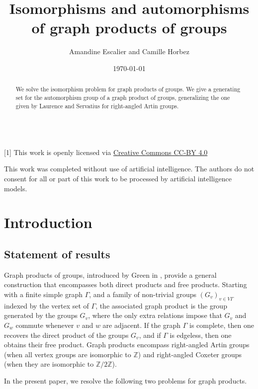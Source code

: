\documentclass[a4paper,english,11pt]{article}
\title{Isomorphisms and automorphisms of graph products of groups}
\author{Amandine Escalier and Camille Horbez}
\date{\today}
\theoremstyle{definition}
\theoremstyle{remark}
\begin{document}
\maketitle
\begin{abstract}
We solve the isomorphism problem for graph products of groups. We give a generating set for the automorphism group of a graph product of groups, generalizing the one given by Laurence and Servatius for right-angled Artin groups. 
\end{abstract}


~\\
\setcounter{tocdepth}{1}
{\small \startcontents  {}[1]{}} \vfill
\noindent \textcolor{black!70}{\small This work is openly licensed via \href{https://creativecommons.org/licenses/by/4.0/}{Creative Commons CC-BY 4.0}}
\smallskip

\noindent \textcolor{black!70}{\small This work was completed without use of artificial intelligence. The authors do not consent for all or part of this work to be processed by artificial intelligence models.}
\newpage

\section{Introduction}
\subsection{Statement of results}

Graph products of groups, introduced by Green in \cite{Gre}, provide a general construction that encompasses both direct products and free products. Starting with a finite simple graph $\Gamma$, and a family of {non-trivial} groups $(G_v)_{v\in V\Gamma}$ indexed by the vertex set of $\Gamma$, the associated graph product is the group generated by the groups $G_v$, where the only extra relations impose that $G_v$ and $G_w$ commute whenever $v$ and $w$ are adjacent. If the graph $\Gamma$ is complete, then one recovers the direct product of the groups $G_v$, and if $\Gamma$ is edgeless, then one obtains their free product. Graph products encompass right-angled Artin groups (when all vertex groups are isomorphic to $\mathbb{Z}$) and right-angled Coxeter groups (when they are isomorphic to $\mathbb{Z}/2\mathbb{Z}$).

In the present paper, we resolve the following two problems for graph products.
\end{document}
